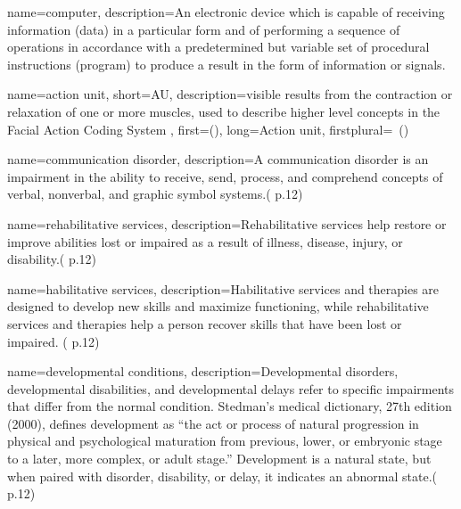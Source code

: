  {
	name={computer}, 
	description={An electronic device which is capable of receiving information (data) in a particular form and of performing a sequence of operations in accordance with a predetermined but variable set of procedural instructions (program) to produce a result in the form of information or signals.
}
}

 {
	name={action unit}, 
	short={AU},
	description={visible results from the contraction or relaxation of one or more muscles, used to describe higher level concepts in the Facial Action Coding System
},
	first={}(),
	long={Action unit},
	firstplural={\glspluralsuffix\ (\glspluralsuffix )}
	
}

 {
	name={communication disorder}, 
	description={A communication disorder is an impairment in the ability to receive, send, process, and comprehend concepts of verbal, nonverbal, and graphic symbol systems.(\cite{SLPathologies} p.12)
}
}

 {
	name={rehabilitative services}, 
	description={Rehabilitative services help restore or improve abilities lost or impaired as a result of illness, disease, injury, or disability.(\cite{SLPathologies} p.12)
}
}

 {
	name={habilitative services}, 
	description={Habilitative services and therapies are designed to develop new skills and maximize functioning, while rehabilitative services and therapies help a person recover skills that have been lost or impaired. (\cite{SLPathologies} p.12)
}
}

 {
	name={developmental conditions}, 
	description={Developmental disorders, developmental disabilities, and developmental delays refer to specific impairments that differ from the normal condition. Stedman’s medical dictionary, 27th edition (2000), defines development as “the act or process of natural progression in physical and psychological maturation from previous, lower, or embryonic stage to a later, more complex, or adult stage.” Development is a natural state, but when paired with disorder, disability, or delay, it indicates an abnormal state.(\cite{SLPathologies} p.12)
}
}

